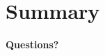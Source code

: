 \documentclass[12pt]{article}
\begin{document}
\section{Summary} %
\label{sec:summary}
\clearpage
\centering
\vspace{50 mm}

\begin{LARGE}{\textbf{Questions?}}\end{LARGE}
\clearpage

\end{document}
